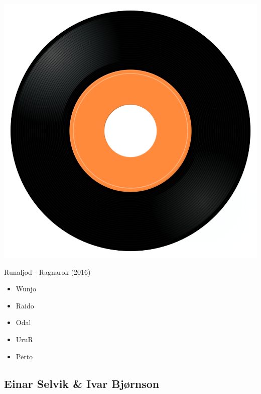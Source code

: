 \begin{minipage}[t]{0.25\textwidth}
\captionsetup{type=figure}
\includegraphics[width=\textwidth]{Images/cover.png}
\caption*{Runaljod - Ragnarok (2016)}
\end{minipage}
\begin{minipage}[t]{0.25\textwidth}\vspace{0pt}
\begin{itemize}[nosep,leftmargin=1em,labelwidth=*,align=left]
	\setlength{\itemsep}{0pt}
	\item Wunjo
	\item Raido
	\item Odal 
	\item UruR
	\item Perto
\end{itemize}
\end{minipage}

\subsection{Einar Selvik \& Ivar Bjørnson}


